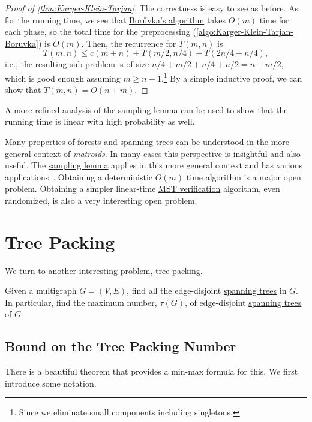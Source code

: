 \begin{proof}[Proof of \autoref{thm:Karger-Klein-Tarjan}]
	The correctness is easy to see as before. As for the running time, we see that \hyperref[algo:Boruvka]{Borůvka's algorithm} takes \(O(m)\) time for each phase, so the total time for the preprocessing (\autoref{algo:Karger-Klein-Tarjan-Boruvka}) is \(O(m)\). Then, the recurrence for \(T(m, n)\) is
	\[
		T(m, n)
		\leq c(m+n) + T(m / 2, n / 4) + T(2n / 4 + n / 4),
	\]
	i.e., the resulting sub-problem is of size \(n / 4 + m / 2 + n / 4 + n / 2 = n + m / 2\), which is good enough assuming \(m \geq n - 1\).\footnote{Since we eliminate small components including singletons.} By a simple inductive proof, we can show that \(T(m, n) = O(n + m) \).
\end{proof}

\begin{remark}
	A more refined analysis of the \hyperref[lma:sampling]{sampling lemma} can be used to show that the running time is linear with high probability as well.
\end{remark}

Many properties of forests and spanning trees can be understood in the more general context of \emph{matroids}. In many cases this perspective is insightful and also useful. The \hyperref[lma:sampling]{sampling lemma} applies in this more general context and has various applications~\cite{karger1995random,karger1998random}. Obtaining a deterministic \(O(m)\) time algorithm is a major open problem. Obtaining a simpler linear-time \hyperref[thm:MST-verification]{MST verification} algorithm, even randomized, is also a very interesting open problem.

\section{Tree Packing}
We turn to another interesting problem, \hyperref[prb:TP]{tree packing}.

\begin{problem}\label{prb:TP}
Given a multigraph \(G = (V, E)\), find all the edge-disjoint \hyperref[def:spanning-tree]{spanning trees} in \(G\). In particular, find the maximum number, \(\tau (G)\), of edge-disjoint \hyperref[def:spanning-tree]{spanning trees} of \(G\)
\end{problem}

\subsection{Bound on the Tree Packing Number}
There is a beautiful theorem that provides a min-max formula for this. We first introduce some notation.

